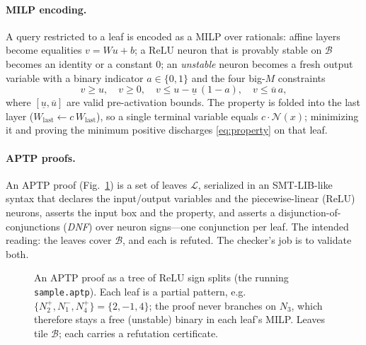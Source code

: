 \documentclass[runningheads]{llncs}
\newcommand{\net}{\mathcal{N}}
\newcommand{\dom}{\mathcal{B}}          %
\newcommand{\leaves}{\mathcal{L}}
\newcommand{\relu}{\ensuremath{\mathrm{ReLU}}}
\newcommand{\code}[1]{\texttt{#1}}
\begin{document}
\paragraph{MILP encoding.}
A query restricted to a leaf is encoded as a MILP over rationals: affine layers
become equalities $v = Wu+b$; a \relu{} neuron that is provably stable on $\dom$
becomes an identity or a constant $0$; an \emph{unstable} neuron becomes a fresh
output variable with a binary indicator $a\in\{0,1\}$ and the four big-$M$
constraints
\[
  v \ge u,\quad v \ge 0,\quad v \le u - \underline u\,(1-a),\quad v \le \overline u\, a,
\]
where $[\underline u,\overline u]$ are valid pre-activation bounds. The property is
folded into the last layer ($W_{\text{last}}\!\leftarrow c\,W_{\text{last}}$), so a
single terminal variable equals $c\cdot\net(x)$; minimizing it and proving the
minimum positive discharges \eqref{eq:property} on that leaf.

\paragraph{APTP proofs.}
An APTP proof (Fig.~\ref{fig:tree}) is a set of leaves $\leaves$, serialized in an
SMT-LIB-like syntax that declares the input/output variables and the piecewise-linear
(\relu) neurons, asserts the input box and the property, and asserts a
disjunction-of-conjunctions (\emph{DNF}) over neuron signs---one conjunction per
leaf. The intended reading: the leaves cover $\dom$, and each is refuted. The
checker's job is to validate both.

\begin{figure}[t]
\centering
{}
\caption{An APTP proof as a tree of \relu{} sign splits (the running
\code{sample.aptp}). Each leaf is a partial pattern, e.g.\
$\{N_2^{+},N_1^{-},N_4^{+}\}=\{2,-1,4\}$; the proof never branches on $N_3$, which
therefore stays a free (unstable) binary in each leaf's MILP. Leaves tile $\dom$;
each carries a refutation certificate.}
\label{fig:tree}
\end{figure}
\end{document}
